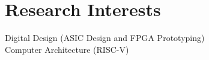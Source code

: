 \section{\sc Research Interests}

Digital Design (ASIC Design and FPGA Prototyping)\\
Computer Architecture (RISC-V) 
\endinput